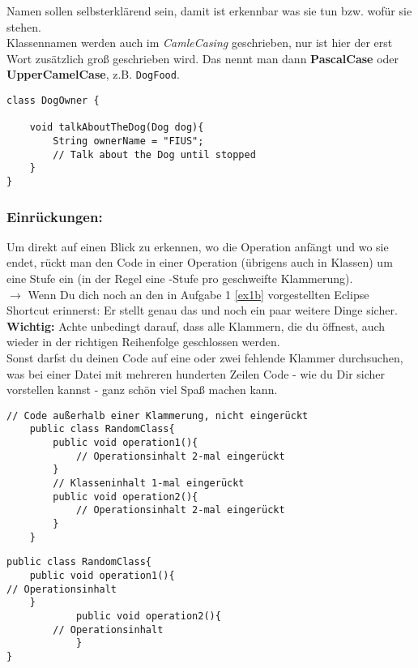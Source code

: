 \noindent
Namen sollen selbsterklärend sein, damit ist erkennbar was sie tun bzw. wofür sie stehen.\\

\noindent
Klassennamen werden auch im \textit{CamleCasing} geschrieben, nur ist hier der erst Wort zusätzlich groß geschrieben wird.
Das nennt man dann \textbf{PascalCase} oder \textbf{UpperCamelCase}, z.B. \lstinline{DogFood}.

\vspace{5mm}

\newpage

\begin{lstlisting}[title=\textbf{Beispiel: Gute Namensgebung}]
class DogOwner {

	void talkAboutTheDog(Dog dog){
		String ownerName = "FIUS";
		// Talk about the Dog until stopped
	}
}
\end{lstlisting}

\subsubsection*{Einrückungen:}
Um direkt auf einen Blick zu erkennen, wo die Operation anfängt und wo sie endet, rückt man den Code in einer Operation (übrigens auch in Klassen) um eine Stufe ein (in der Regel eine -Stufe pro geschweifte Klammerung).\\
$\rightarrow$ Wenn Du dich noch an den in Aufgabe 1 \ref{ex1b} vorgestellten Eclipse Shortcut erinnerst: Er stellt genau das und noch ein paar weitere Dinge sicher.\\

\noindent
{\color{red}\bfseries Wichtig:} Achte unbedingt darauf, dass alle Klammern, die du öffnest, auch wieder in der richtigen Reihenfolge geschlossen werden.\\
Sonst darfst du deinen Code auf eine oder zwei fehlende Klammer durchsuchen, was bei einer Datei mit mehreren hunderten Zeilen Code - wie du Dir sicher vorstellen kannst - ganz schön viel Spaß machen kann.

\begin{lstlisting}[title=\textbf{Beispiel: Gute Bezeichner}]
	// Code außerhalb einer Klammerung, nicht eingerückt
	public class RandomClass{
		public void operation1(){
			// Operationsinhalt 2-mal eingerückt
		}
		// Klasseninhalt 1-mal eingerückt
		public void operation2(){
			// Operationsinhalt 2-mal eingerückt
		}
	}
\end{lstlisting}

\begin{lstlisting}[title=\textbf{Beispiel: Schlechte Einrückung}]
	public class RandomClass{
	public void operation1(){
// Operationsinhalt
	}
			public void operation2(){
		// Operationsinhalt
			}
}
\end{lstlisting}
